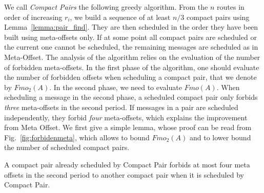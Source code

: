 \documentclass[a4paper,UKenglish,cleveref, autoref, thm-restate]{lipics-v2019}
\begin{document}
We call \emph{Compact Pairs} the following greedy algorithm. From the $n$ routes in order
of increasing $r_i$, we build a sequence of at least $n/3$ compact pairs using Lemma~\ref{lemma:pair_find}. They are then scheduled in the order they have been built using meta-offsets only. If at some point all compact pairs are scheduled or the current one cannot be scheduled, the remaining messages are scheduled as in Meta-Offset. The analysis of the algorithm relies on the evaluation of the number of forbidden meta-offsets. In the first phase of the algorithm, one should evaluate the number of forbidden offsets when scheduling a compact pair, that we denote by $Fmo_2(A)$. In the second phase, we need to evaluate $Fmo(A)$. When scheduling a message in the second phase, a scheduled compact pair only forbids \emph{three} meta-offsets in the second period. If messages in a pair are scheduled independently, they forbid \emph{four} meta-offsets, which explains the improvement from Meta Offset. We first give a simple lemma, whose proof can be read from Fig.~\ref{fig:forbidenmeta}, which allows to bound $Fmo_2(A)$ and to lower bound the number of scheduled compact pairs.

\begin{lemma}\label{lemma:pair_forbid}
A compact pair already scheduled by Compact Pair forbids at most four meta offsets in the second period to another compact pair when it is scheduled by Compact Pair.
\end{lemma}
\end{document}

